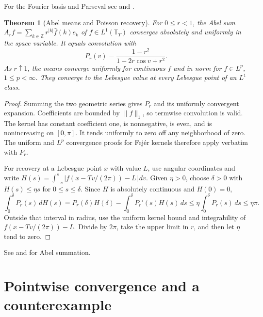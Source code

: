 \documentclass[11pt,oneside,openany]{book}
\newtheorem{theorem}{Theorem}[chapter]
\theoremstyle{definition}
\theoremstyle{remark}
\begin{document}
For the Fourier basis and Parseval see \cite[Section~8.3, Theorem~8.20]{folland}
and \cite[Section~3.2, Propositions~3.2.6--3.2.7]{grafakos}.

\begin{theorem}[Abel means and Poisson recovery]
\label{p102:U1-04}
For $0\le r<1$, the Abel sum
$A_r f=\sum_{k\in\mathbb Z}r^{|k|}\widehat f(k)e_k$
of $f\in L^1(\mathbb T_T)$ converges absolutely and uniformly in the
space variable. It equals convolution with
\[
 P_r(v)=\frac{1-r^2}{1-2r\cos v+r^2}.
\]
As $r\uparrow1$, the means converge uniformly for continuous $f$ and
in norm for $f\in L^p$, $1\le p<\infty$. They converge to the
Lebesgue value at every Lebesgue point of an $L^1$ class.
\end{theorem}

\begin{proof}
Summing the two geometric series gives $P_r$ and its uniformly
convergent expansion. Coefficients are bounded by $\|f\|_1$, so
termwise convolution is valid. The kernel has constant coefficient
one, is nonnegative, is even, and is nonincreasing on $[0,\pi]$.
It tends uniformly to zero off any neighborhood of zero. The
uniform and $L^p$ convergence proofs for Fej\'er kernels therefore
apply verbatim with $P_r$.

For recovery at a Lebesgue point $x$ with value $L$, use angular
coordinates and write
$H(s)=\int_{-s}^{s}|f(x-Tv/(2\pi))-L|\,dv$.
Given $\eta>0$, choose $\delta>0$ with $H(s)\le\eta s$ for
$0\le s\le\delta$. Since $H$ is absolutely continuous and $H(0)=0$,
\[
 \int_0^\delta P_r(s)\,dH(s)
 =P_r(\delta)H(\delta)-\int_0^\delta P_r'(s)H(s)\,ds
 \le\eta\int_0^\delta P_r(s)\,ds\le\eta\pi.
\]
Outside that interval in radius, use the uniform kernel bound and
integrability of $f(x-Tv/(2\pi))-L$. Divide by $2\pi$, take the upper
limit in $r$, and then let $\eta$ tend to zero.
\end{proof}

See \cite[Chapter~2, Section~5.3]{stein-shakarchi} and
\cite[Section~8.4]{folland} for Abel summation.

\section{Pointwise convergence and a counterexample}
\end{document}
